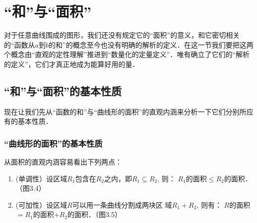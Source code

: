 \section{{``}和{''}与{``}面积{''}}

对于任意曲线围成的图形，我们还没有规定它的“面积”的意义，和它密切相关的“函数从$a$到$b$的和”的概念至今也没有明确的解析的定义．在这一节我们要把这两个概念由“直观的定性理解”推进到“数量化的定量定义”．唯有确立了它们的“解析的定义”，它们才真正地成为能算好用的量．

\subsection{{``}和{''}与{``}面积{''}的基本性质}

现在让我们先从“函数的和”与“曲线形的面积”的直观内涵来分析一下它们分别所应有的基本性质．

\subsubsection{{``}曲线形的面积{''}的基本性质}

从面积的直观内涵容易看出下列两点：
\begin{enumerate}
\item (单调性）设区域$R_1$包含在$R_2$之内，即$R_1\subseteq R_2$, 则：
$R_1$的面积$\le R_2$的面积．（图3.4）
\item (可加性）设区域$R$可以用一条曲线分割成两块区
域$R_1+R_2$, 则有：
$R$的面积$=R_1$的面积$+R_2$的面积．（图3.5）
\end{enumerate}

\begin{figure}[htp]
    \centering
    \begin{minipage}[t]{0.48\textwidth}
    \centering
    \caption{}
    \end{minipage}
    \begin{minipage}[t]{0.48\textwidth}
    \centering
    \caption{}
    \end{minipage}
\end{figure}

